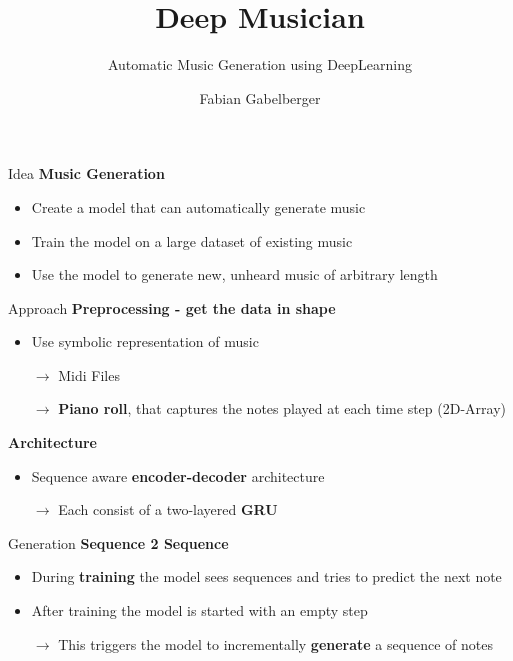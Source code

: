 \documentclass[xcolor={dvipsnames},12pt]{beamer}
\title{Deep Musician}
\subtitle{Automatic Music Generation using DeepLearning}
\author{Fabian Gabelberger}
\begin{document}
\maketitle

\begin{frame}{Idea}
    \textbf{Music Generation}
    \begin{itemize}
        \setlength\itemsep{1em}
        \item Create a model that can automatically generate music
        \item Train the model on a large dataset of existing music
        \item Use the model to generate new, unheard music of arbitrary length
    \end{itemize}
\end{frame}

\begin{frame}{Approach}
    \textbf{Preprocessing - get the data in shape}
    \begin{itemize}
        \item Use symbolic representation of music
        \item[$\rightarrow$] Midi Files
        \item[$\rightarrow$] \textbf{Piano roll}, that captures the
            notes played at each time step (2D-Array)
    \end{itemize}

    \textbf{Architecture}
    \begin{itemize}
        \item Sequence aware \textbf{encoder-decoder} architecture
        \item[$\rightarrow$] Each consist of a two-layered \textbf{GRU}
    \end{itemize}
\end{frame}

\begin{frame}{Generation}
    \textbf{Sequence 2 Sequence}
    \begin{itemize}
        \item During \textbf{training} the model sees sequences and tries
              to predict the next note  
        \item After training the model is started with an empty step
        \item[$\rightarrow$] This triggers the model to incrementally
            \textbf{generate}
            a sequence of notes
    \end{itemize}
\end{frame}
\end{document}
